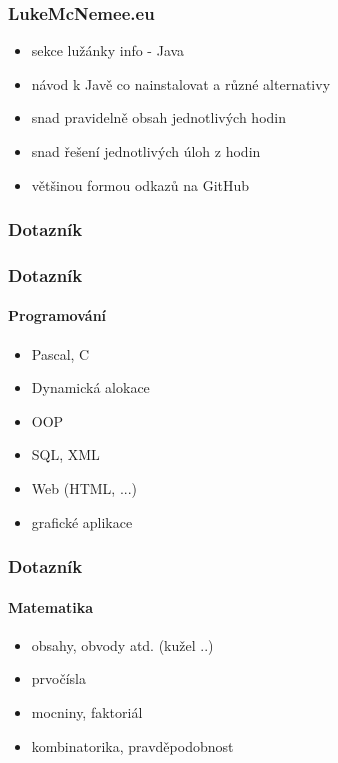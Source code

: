 \documentclass[nologo]{slides}
\begin{document}
\begin{frame}
    \frametitle{LukeMcNemee.eu}

    \begin{itemize}
        \item sekce lužánky info - Java
        \item návod k Javě co nainstalovat a různé alternativy
        \item snad pravidelně obsah jednotlivých hodin
        \item snad řešení jednotlivých úloh z hodin
        \item většinou formou odkazů na GitHub
    \end{itemize}

\end{frame}



\begin{frame}
    \frametitle{Dotazník}


\end{frame}

\begin{frame}
    \frametitle{Dotazník}
    \framesubtitle{Programování}

    \begin{itemize}
        \item Pascal, C
        \item Dynamická alokace
        \item OOP
        \item SQL, XML
        \item Web (HTML, ...)
        \item grafické aplikace
    \end{itemize}

\end{frame}

\begin{frame}
    \frametitle{Dotazník}
    \framesubtitle{Matematika}

    \begin{itemize}
        \item obsahy, obvody atd. (kužel ..)
        \item prvočísla
        \item mocniny, faktoriál
        \item kombinatorika, pravděpodobnost
    \end{itemize}

\end{frame}
\end{document}
